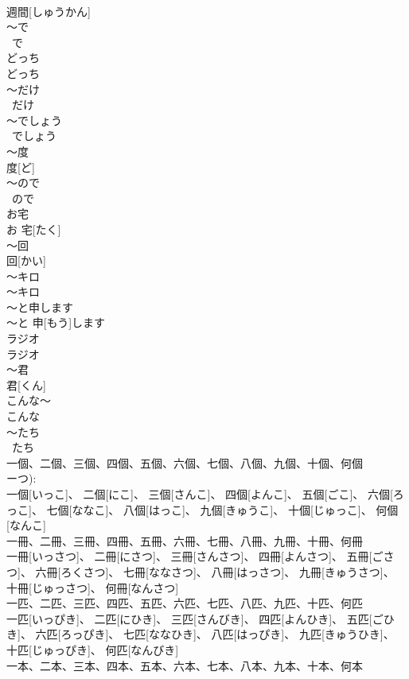 \documentclass[8pt]{extreport}
\begin{document}
\begin{CJK}{UTF8}{min}
\\	週間[しゅうかん]
\\	～で	
\\	~で
\\	どっち	
\\	どっち
\\	～だけ	
\\	~だけ
\\	～でしょう	
\\	~でしょう
\\	～度	
\\	度[ど]
\\	～ので	
\\	~ので
\\	お宅	
\\	お 宅[たく]
\\	～回	
\\	回[かい]
\\	～キロ	
\\	～キロ
\\	～と申します	
\\	～と 申[もう]します
\\	ラジオ	
\\	ラジオ
\\	～君	
\\	君[くん]
\\	こんな～	
\\	こんな~
\\	～たち	
\\	~たち
\\	一個、二個、三個、四個、五個、六個、七個、八個、九個、十個、何個	
\\	ーつ): 
\\	一個[いっこ]、 二個[にこ]、 三個[さんこ]、 四個[よんこ]、 五個[ごこ]、 六個[ろっこ]、 七個[ななこ]、 八個[はっこ]、 九個[きゅうこ]、 十個[じゅっこ]、 何個[なんこ]
\\	一冊、二冊、三冊、四冊、五冊、六冊、七冊、八冊、九冊、十冊、何冊	
\\	一冊[いっさつ]、 二冊[にさつ]、 三冊[さんさつ]、 四冊[よんさつ]、 五冊[ごさつ]、 六冊[ろくさつ]、 七冊[ななさつ]、 八冊[はっさつ]、 九冊[きゅうさつ]、 十冊[じゅっさつ]、 何冊[なんさつ]
\\	一匹、二匹、三匹、四匹、五匹、六匹、七匹、八匹、九匹、十匹、何匹	
\\	一匹[いっぴき]、 二匹[にひき]、 三匹[さんびき]、 四匹[よんひき]、 五匹[ごひき]、 六匹[ろっぴき]、 七匹[ななひき]、 八匹[はっぴき]、 九匹[きゅうひき]、 十匹[じゅっぴき]、 何匹[なんびき]
\\	一本、二本、三本、四本、五本、六本、七本、八本、九本、十本、何本	

\end{CJK}
\end{document}
